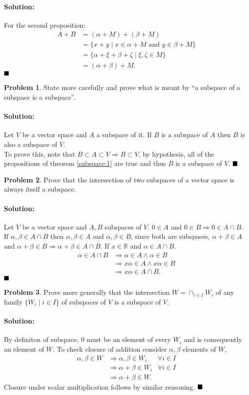 \documentclass[]{article}
\newcommand{\RR}{\mathbb{R}}
\theoremstyle{definition}
\newtheorem{problem}{Problem}
\newenvironment{solution}{\paragraph{Solution:}}{\hfill$\blacksquare \\$}
\begin{document}
\begin{solution}
	
	For the second proposition:
	\begin{align*}
		A + B &= (\alpha + M) + (\beta + M) \\
			  &= \{x + y \mid x \in \alpha + M \text{ and } y \in \beta + M \} \\
			  &= \{\alpha + \xi + \beta + \zeta \mid \xi, \zeta \in M\} \\
			  &= (\alpha + \beta) + M.
	\end{align*}
\end{solution}
\begin{problem}
State more carefully and prove what is meant by ``a subspace of a subspace is a subspace''.	
\end{problem}
\begin{solution}
	Let $V$ be a vector space and $A$ a subspace of it. If $B$ is a subspace of $A$ then $B$ is also a subspace of $V$.
	\\
	To prove this, note that $B \subset A \subset V \Rightarrow B \subset V$, by hypothesis, all of the propositions of theorem \ref{subspace:1} are true and thus $B$ is a subspace of $V$.
\end{solution}
\begin{problem}
Prove that the intersection of two subspaces of a vector space is always itself a subspace.	
\end{problem}
\begin{solution}
Let $V$ be a vector space and $A,B$ subspaces of $V$. $0 \in A$ and $0 \in B \Rightarrow 0 \in A \cap B$. If $\alpha,\beta \in A \cap B$ then $\alpha,\beta \in A$ and $\alpha, \beta \in B$, since both are subspaces, $\alpha+\beta \in A$ and $\alpha + \beta \in B \Rightarrow \alpha+\beta \in A \cap B$. If $x \in \RR$ and $\alpha \in A \cap B$.
\begin{align*}
\alpha \in A \cap B & \Rightarrow \alpha \in A \wedge \alpha \in B \\
& \Rightarrow x\alpha \in A \wedge x\alpha \in B \\
& \Rightarrow x\alpha \in A \cap B.
\end{align*} 
\end{solution}
\begin{problem}
Prove more generally that the intersection $W = \cap_{i\in I} W_i$ of any family $\{W_i \mid i \in I \}$ of subspaces of $V$ is a subspace of $V$.
\end{problem}
\begin{solution}
	By definiton of subspace, $0$ must be an element of every $W_i$ and is consequently an element of $W$. To check closure of addition consider $\alpha, \beta$ elements of $W$,
	\begin{align*}
	\alpha, \beta \in W & \Rightarrow \alpha, \beta \in W_i & \forall i \in I \\
	& \Rightarrow \alpha + \beta \in W_i & \forall i \in I \\
	& \Rightarrow \alpha + \beta \in W.
	\end{align*}
	Closure under scalar multiplication follows by similar reasoning. 
\end{solution}
\end{document}
